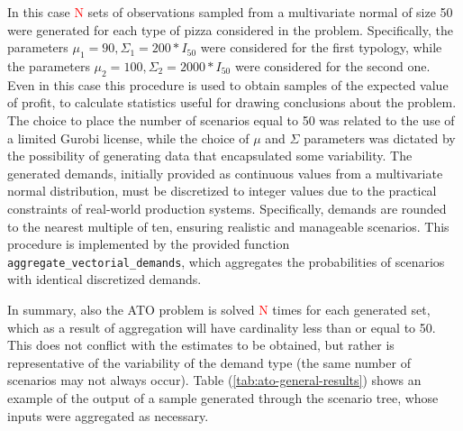 \documentclass[a4paper,12pt]{article}
\begin{document}
	\noindent In this case \textcolor{red}{N} sets of observations sampled from a multivariate normal of size 50 were generated for each type of pizza considered in the problem. Specifically, the parameters $\mu_{1} = 90, \Sigma_{1} = 200 * I_{50}$ were considered for the first typology, while the parameters $\mu_{2} = 100, \Sigma_{2} = 2000 * I_{50}$ were considered for the second one. Even in this case this procedure is used to obtain samples of the expected value of profit, to calculate statistics useful for drawing conclusions about the problem. 
	The choice to place the number of scenarios equal to 50 was related to the use of a limited Gurobi license, while the choice of $\mu$ and $\Sigma$ parameters was dictated by the possibility of generating data that encapsulated some variability. The generated demands, initially provided as continuous values from a multivariate normal distribution, must be discretized to integer values due to the practical constraints of real-world production systems. Specifically, demands are rounded to the nearest multiple of ten, ensuring realistic and manageable scenarios. This procedure is implemented by the provided function \texttt{aggregate\_vectorial\_demands}, which aggregates the probabilities of scenarios with identical discretized demands. 
	
	\noindent In summary, also the ATO problem is solved \textcolor{red}{N} times for each generated set, which as a result of aggregation will have cardinality less than or equal to 50. This does not conflict with the estimates to be obtained, but rather is representative of the variability of the demand type (the same number of scenarios may not always occur). Table (\ref{tab:ato-general-results}) shows an example of the output of a sample generated through the scenario tree, whose inputs were aggregated as necessary.
	
\end{document}
